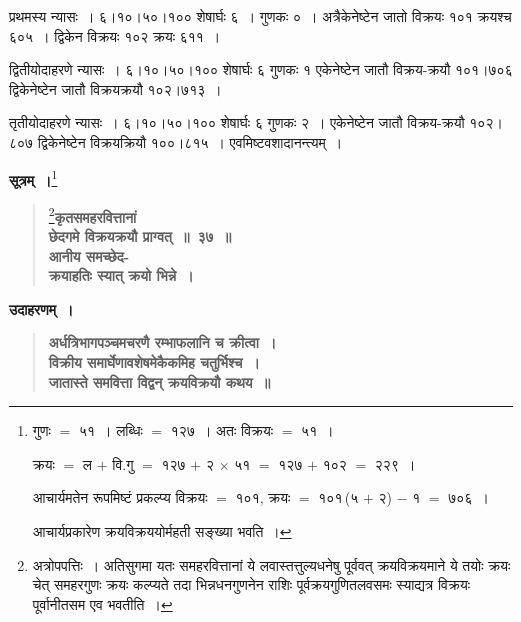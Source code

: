\documentclass[11pt, openany]{book}
\begin{document}
\begin{sloppypar}
प्रथमस्य न्यासः~। ६।१०।५०।१०० शेषार्घः ६~। गुणकः ०~। अत्रैकेनेष्टेन जातो विक्रयः १०१ क्रयश्च ६०५~। द्विकेन विक्रयः १०२ क्रयः ६११~।
\vspace{2mm}

द्वितीयोदाहरणे न्यासः~। ६।१०।५०।१०० शेषार्घः ६ गुणकः १ एकेनेष्टेन जातौ विक्रय-क्रयौ १०१।७०६ द्विकेनेष्टेन जातौ विक्रयक्रयौ १०२।७१३~। 
\vspace{2mm}

तृतीयोदाहरणे न्यासः~। ६।१०।५०।१०० शेषार्घः ६ गुणकः २~। एकेनेष्टेन जातौ विक्रय-क्रयौ १०२।८०७ द्विकेनेष्टेन विक्रयक्रियौ १००।८१५~। एवमिष्टवशादानन्त्यम्~।
\end{sloppypar}

\newpage

\noindent \textbf{सूत्रम्~।}\renewcommand{\thefootnote}{}\footnote{गुणः $=$ ५१~। लब्धिः $=$ १२७~। अतः विक्रयः $=$ ५१~। 
\vspace{1mm}

\hspace{2mm} क्रयः $=$ ल $+$ वि.गु $=$ १२७ $+$ २ $\times$ ५१ $=$ १२७ $+$ १०२ $=$ २२९~। 
\vspace{1mm}

\hspace{2mm} आचार्यमतेन रूपमिष्टं प्रकल्प्य विक्रयः $=$ १०१, क्रयः $=$ १०१\,(५ $+$ २) $-$ १ $=$ ७०६~। 
\vspace{1mm}

\hspace{2mm} आचार्यप्रकारेण क्रयविक्रययोर्महती सङ्ख्या भवति~। 
\vspace{1mm}}

 \label{2.37}
\begin{quote}
\renewcommand{\thefootnote}{१}\footnote{अत्रोपपत्तिः~। अतिसुगमा यतः समहरवित्तानां ये लवास्तत्तुल्यधनेषु पूर्ववत् क्रयविक्रयमाने ये तयोः क्रयः चेत् समहरगुणः क्रयः कल्प्यते तदा भिन्नधनगुणनेन राशिः पूर्वक्रयगुणितलवसमः स्याद्यत्र विक्रयः पूर्वानीतसम एव भवतीति~।}{\large \textbf{{\color{purple}कृतसमहरवित्तानां \\
छेदगमे विक्रयक्रयौ प्राग्वत्~॥~३७~॥\\
आनीय समच्छेद-\\
क्रयाहतिः स्यात् क्रयो भिन्ने~।}}}
\end{quote}

\noindent \textbf{उदाहरणम्~।}

 \label{Ex 2.41}
\begin{quote}
\textbf{{\color{red}अर्धत्रिभागपञ्चमचरणै रम्भाफलानि च क्रीत्वा~।\\
विक्रीय समार्घेणावशेषमेकैकमिह चतुर्भिश्च~।\\
जातास्ते समवित्ता विद्वन् क्रयविक्रयौ कथय~॥}}
\end{quote}
\end{document}
